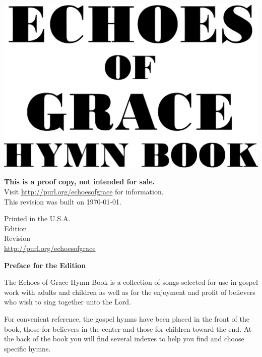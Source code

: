 \documentclass{book}
\renewcommand{\year}{\DTMfetchyear{now} }
\begin{document}

\vspace*{1in}

\noindent\hfil\includegraphics[scale=0.06]{booklayout/bodoni-scan}\hfil

\vfill

%
\begin{center}
\textbf{This is a proof copy, not intended for sale.} \\
Visit \url{http://purl.org/echoesofgrace} for information.\\
This revision was built on \today.
\end{center}

\pagebreak

\vspace*{\fill}
\begin{center}
Printed in the U.S.A.\\
\year Edition\\
Revision \\
\url{http://purl.org/echoesofgrace}
\end{center}

\pagebreak


\vspace*{1.5in}
\noindent\hfil{\textbf{Preface for the \year Edition}}\hfil

The {\textit{}Echoes of Grace Hymn Book} is a collection of songs selected for
use in gospel work with adults and children as well as for the enjoyment and
profit of believers who wish to sing together unto the Lord.

For convenient reference, the gospel hymns have been placed in the front of the
book, those for believers in the center and those for children toward the end.
At the back of the book you will find several indexes to help you find and
choose specific hymns.
\end{document}
